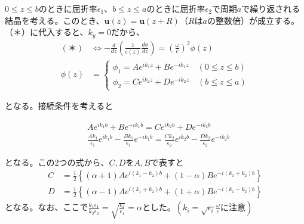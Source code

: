 \documentclass[a4paper,11pt,dvipdfmx]{jsarticle}
\begin{document}
\begin{enumerate}
  
  $0 \leq z \leq b$のときに屈折率$\epsilon_1$、$b \leq z \leq a$のときに屈折率$\epsilon_2$で周期$a$で繰り返される結晶を考える。このとき、$\mathbf{u} (z) = \mathbf{u} (z + R)$（$R$は$a$の整数倍）が成立する。（＊）に代入すると、$k_y = 0$だから、
  \begin{align*}
    (＊) &\Longleftrightarrow - \frac{d}{dz}\left( \frac{1}{\epsilon(z)} \frac{d\phi}{dz} \right) = \left( \frac{\omega}{c} \right)^2 \phi(z)
    \\
    \phi (z) &= 
    \begin{cases}
      \phi_1 = A e^{ik_1 z} + B e^{- i k_1 z} \quad \left( 0 \leq z \leq b \right) \\
      \phi_2 = C e^{ik_2 z} + D e^{- i k_2 z} \quad \left( b \leq z \leq a \right)
    \end{cases}
  \end{align*}

  となる。接続条件を考えると

  \begin{align*}
    & A e^{i k_1 b} + B e^{- i k_1 b} = C e^{i k_2 b} + D e^{- i k_2 b}
    \\
    & \frac{A k_1}{\epsilon_1} e^{i k_1 b} - \frac{B k_1}{\epsilon_1} e^{- i k_1 b} = \frac{C k_2}{\epsilon_2} e^{i k_2 b} - \frac{D k_2}{\epsilon_2}e^{- i k_2 b}
  \end{align*}

  となる。この2つの式から、$C, D$を$A, B$で表すと
  \begin{align*}
    C &= \frac{1}{2} \left\{ \left( \alpha + 1 \right) A e^{i \left( k_1 - k_2 \right) b } + \left( 1 - \alpha \right) B e^{- i \left( k_1 + k_2 \right) b } \right\} \\
    D &= \frac{1}{2} \left\{ \left( \alpha - 1 \right) A e^{i \left( k_1 + k_2 \right) b} + \left( 1 + \alpha \right) B e^{- i (k_1 - k_2)b} \right\}
  \end{align*}
  となる。なお、ここで$\displaystyle \frac{k_1 \epsilon_1}{k_2 \epsilon_2} = \sqrt{\frac{\epsilon_2}{\epsilon_1}} = \alpha$とした。$\left( \displaystyle k_i = \sqrt{\epsilon_i} \frac{\omega}{c}  に注意 \right) $


\end{enumerate}
\end{document}
